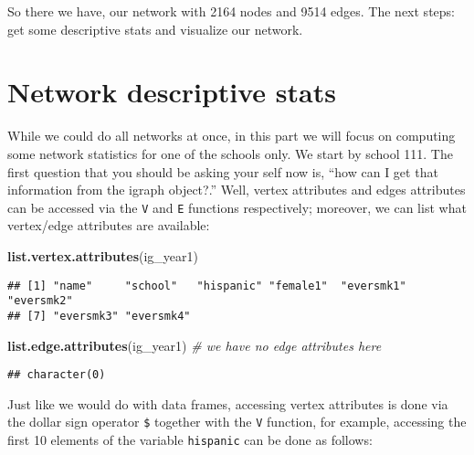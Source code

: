 \documentclass[]{book}
\newenvironment{Shaded}{\begin{snugshade}}{\end{snugshade}}
\newcommand{\KeywordTok}[1]{\textcolor[rgb]{0.13,0.29,0.53}{\textbf{#1}}}
\newcommand{\DecValTok}[1]{\textcolor[rgb]{0.00,0.00,0.81}{#1}}
\newcommand{\CommentTok}[1]{\textcolor[rgb]{0.56,0.35,0.01}{\textit{#1}}}
\newcommand{\OperatorTok}[1]{\textcolor[rgb]{0.81,0.36,0.00}{\textbf{#1}}}
\newcommand{\NormalTok}[1]{#1}
\theoremstyle{definition}
\theoremstyle{definition}
\theoremstyle{definition}
\theoremstyle{remark}
\begin{document}
So there we have, our network with 2164 nodes and 9514 edges. The next
steps: get some descriptive stats and visualize our network.

\section{Network descriptive stats}\label{network-descriptive-stats}

While we could do all networks at once, in this part we will focus on
computing some network statistics for one of the schools only. We start
by school 111. The first question that you should be asking your self
now is, ``how can I get that information from the igraph object?.''
Well, vertex attributes and edges attributes can be accessed via the
\texttt{V} and \texttt{E} functions respectively; moreover, we can list
what vertex/edge attributes are available:

\begin{Shaded}
\begin{Highlighting}[]
\KeywordTok{list.vertex.attributes}\NormalTok{(ig_year1)}
\end{Highlighting}
\end{Shaded}

\begin{verbatim}
## [1] "name"     "school"   "hispanic" "female1"  "eversmk1" "eversmk2"
## [7] "eversmk3" "eversmk4"
\end{verbatim}

\begin{Shaded}
\begin{Highlighting}[]
\KeywordTok{list.edge.attributes}\NormalTok{(ig_year1) }\CommentTok{# we have no edge attributes here}
\end{Highlighting}
\end{Shaded}

\begin{verbatim}
## character(0)
\end{verbatim}

Just like we would do with data frames, accessing vertex attributes is
done via the dollar sign operator \texttt{\$} together with the
\texttt{V} function, for example, accessing the first 10 elements of the
variable \texttt{hispanic} can be done as follows:

\begin{Shaded}
\end{Shaded}
\end{document}

